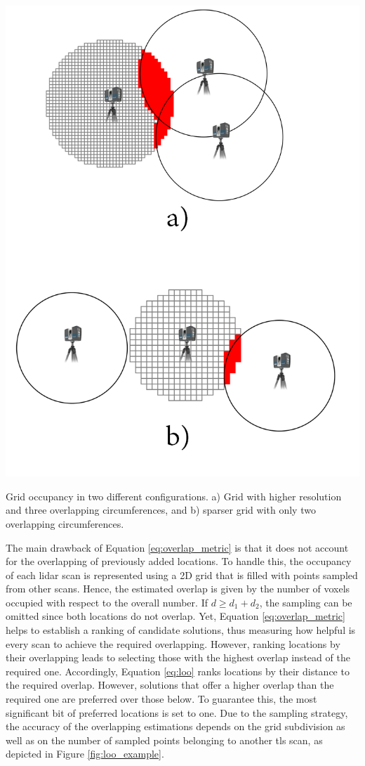 \begin{marginfigure}[.0cm]
    \centering
    \includegraphics[width=\linewidth]{figs/lidar_optimization/loo.png}
	\caption{Grid occupancy in two different configurations. a) Grid with higher resolution and three overlapping circumferences, and b) sparser grid with only two overlapping circumferences.}
	\label{fig:loo_example}
\end{marginfigure}
The main drawback of Equation \ref{eq:overlap_metric} is that it does not account for the overlapping of previously added locations. To handle this, the occupancy of each \acrshort{lidar} scan is represented using a 2D grid that is filled with points sampled from other scans. Hence, the estimated overlap is given by the number of voxels occupied with respect to the overall number. If $d \geq d_1 + d_2$, the sampling can be omitted since both locations do not overlap. Yet, Equation \ref{eq:overlap_metric} helps to establish a ranking of candidate solutions, thus measuring how helpful is every scan to achieve the required overlapping. However, ranking locations by their overlapping leads to selecting those with the highest overlap instead of the required one. Accordingly, Equation \ref{eq:loo} ranks locations by their distance to the required overlap. However, solutions that offer a higher overlap than the required one are preferred over those below. To guarantee this, the most significant bit of preferred locations is set to one. Due to the sampling strategy, the accuracy of the overlapping estimations depends on the grid subdivision as well as on the number of sampled points belonging to another \acrshort{tls} scan, as depicted in Figure \ref{fig:loo_example}.

